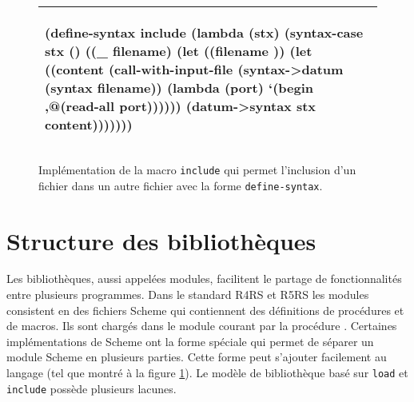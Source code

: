 

\begin{figure}[ht]
\begin{tabular}{|l|}\hline
\begin{mplisting}{0.8}
(define-syntax include
  (lambda (stx)
    (syntax-case stx ()
      ((_ filename)
       (let ((filename ))
         (let ((content
                 (call-with-input-file
                    (syntax->datum (syntax filename))
                    (lambda (port)
                      `(begin ,@(read-all port))))))
           (datum->syntax stx content)))))))
\end{mplisting}\\\hline

\end{tabular}
   \caption{Implémentation de la macro \texttt{include} qui permet l'inclusion
   d'un fichier dans un autre fichier avec la forme \texttt{define-syntax}.}

   \label{fig:macro_include_def_syntax}
\end{figure}

\section{Structure des bibliothèques}

Les bibliothèques, aussi appelées modules, facilitent le partage de
fonctionnalités entre plusieurs programmes. Dans le standard
R4RS\cite{Scheme:R4RS} et R5RS\cite{Scheme:R5RS} les modules consistent en des
fichiers Scheme qui contiennent des définitions de procédures et de macros. Ils
sont chargés dans le module courant par la procédure . Certaines
implémentations de Scheme ont la forme spéciale  qui permet de
séparer un module Scheme en plusieurs parties. Cette forme peut s'ajouter
facilement au langage (tel que montré à la figure
\ref{fig:macro_include_def_syntax}).  Le modèle de bibliothèque basé sur
\texttt{load} et \texttt{include} possède plusieurs lacunes.

